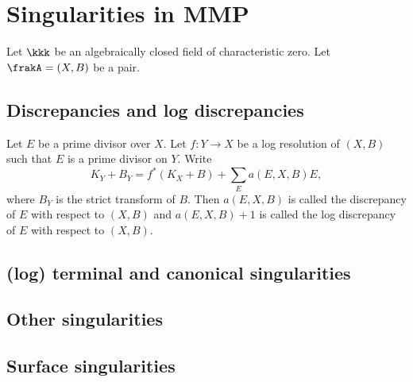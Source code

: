 \section{Singularities in MMP}

  Let $\kkk$ be an algebraically closed field of characteristic zero.
  Let $\frakA = (X,B)$ be a pair.

\subsection{Discrepancies and log discrepancies}

  \begin{definition}
    Let $E$ be a prime divisor over $X$.
    Let $f: Y \to X$ be a log resolution of $(X,B)$ such that $E$ is a prime divisor on $Y$.
    Write
    \[ K_Y + B_Y = f^*(K_X + B) + \sum_E a(E,X,B) E, \]
    where $B_Y$ is the strict transform of $B$.
    Then $a(E,X,B)$ is called the discrepancy of $E$ with respect to $(X,B)$ and $a(E,X,B) + 1$ is called the log discrepancy of $E$ with respect to $(X,B)$.
    \Yang{}
  \end{definition}



\subsection{(log) terminal and canonical singularities}



\subsection{Other singularities}



\subsection{Surface singularities}
